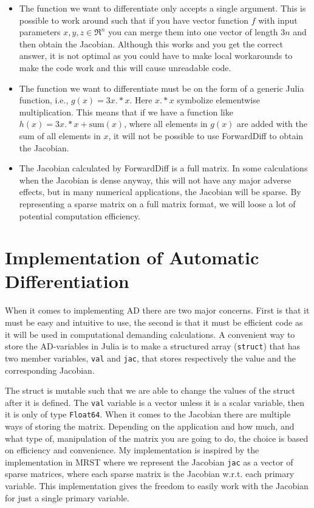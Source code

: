 \begin{itemize}
    \item The function we want to differentiate only accepts a single argument. This is possible to work around such that if you have vector function $f$ with input parameters $x,y,z \in \Re^n$ you can merge them into one vector of length $3n$ and then obtain the Jacobian. Although this works and you get the correct answer, it is not optimal as you could have to make local workarounds to make the code work and this will cause unreadable code.
    \item The function we want to differentiate must be on the form of a generic Julia function, i.e., $g(x) = 3x.*x$. Here $x.*x$ symbolize elementwise multiplication. This means that if we have a function like $h(x) = 3x.*x + \text{sum}(x)$, where all elements in $g(x)$ are added with the sum of all elements in $x$, it will not be possible to use ForwardDiff to obtain the Jacobian.
    \item The Jacobian calculated by ForwardDiff is a full matrix. In some calculations when the Jacobian is dense anyway, this will not have any major adverse effects, but in many numerical applications, the Jacobian will be sparse. By representing a sparse matrix on a full matrix format, we will loose a lot of potential computation efficiency.
\end{itemize}

\section{Implementation of Automatic Differentiation}
When it comes to implementing AD there are two major concerns. First is that it must be easy and intuitive to use, the second is that it must be efficient code as it will be used in computational demanding calculations. A convenient way to store the AD-variables in Julia is to make a structured array (\texttt{struct}) that has two member variables, \texttt{val} and \texttt{jac}, that stores respectively the value and the corresponding Jacobian. 
 
The struct is mutable such that we are able to change the values of the struct after it is defined. The \texttt{val} variable is a vector unless it is a scalar variable, then it is only of type  \texttt{Float64}. When it comes to the Jacobian there are multiple ways of storing the matrix. Depending on the application and how much, and what type of, manipulation of the matrix you are going to do, the choice is based on efficiency and convenience. My implementation is inspired by the implementation in MRST \emph{\citep{lieMrstUrl}} where we represent the Jacobian \texttt{jac} as a vector of sparse matrices, where each sparse matrix is the Jacobian w.r.t. each primary variable. This implementation gives the freedom to easily work with the Jacobian for just a single primary variable.

